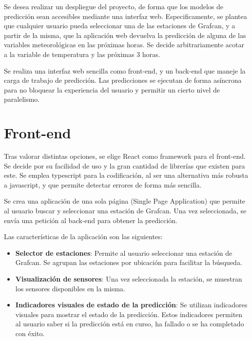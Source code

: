 
Se desea realizar un despliegue del proyecto, de forma que los modelos de predicción sean accesibles mediante una interfaz web. Especificamente, se plantea que cualquier usuario 
pueda seleccionar una de las estaciones de Grafcan, y a partir de la misma, que la aplicación web devuelva la predicción de alguna de las variables meteorológicas en las próximas horas. 
Se decide arbitrariamente acotar a la variable de temperatura y las próximas 3 horas.

Se realiza una interfaz web sencilla como front-end, y un back-end que maneje la carga de trabajo de predicción. Las predicciones se ejecutan de forma asíncrona 
para no bloquear la experiencia del usuario y permitir un cierto nivel de paralelismo.

\section{Front-end}
Tras valorar distintas opciones, se elige React como framework para el front-end. Se decide por su facilidad de uso y la gran cantidad de librerías que existen para este.
Se emplea typescript para la codificación, al ser una alternativa más robusta a javascript, y que permite detectar errores de forma más sencilla.

Se crea una aplicación de una sola página (Single Page Application) que permite al usuario buscar y seleccionar una estación de Grafcan. Una vez seleccionada,
se envía una petición al back-end para obtener la predicción.

Las características de la aplicación son las siguientes:
\begin{itemize}
    \item \textbf{Selector de estaciones}: Permite al usuario seleccionar una estación de Grafcan. Se agrupan las estaciones por ubicación para facilitar la búsqueda.
    \item \textbf{Visualización de sensores}: Una vez seleccionada la estación, se muestran los sensores disponibles en la misma. 
    \item \textbf{Indicadores visuales de estado de la predicción}: Se utilizan indicadores visuales para mostrar el estado de la predicción. Estos indicadores permiten al usuario saber si la predicción está en curso, ha fallado o se ha completado con éxito.
\end{itemize}


